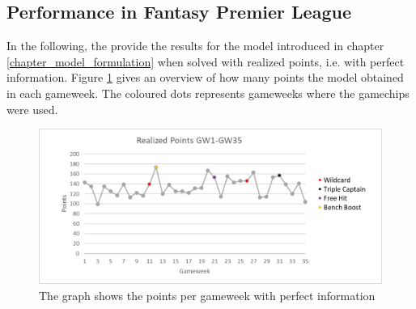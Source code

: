 \subsection{Performance in Fantasy Premier League}
In the following, the provide the results for the model introduced in chapter \ref{chapter_model_formulation} when solved with realized points, i.e. with perfect information. Figure \ref{Figure_Realized_points} gives an overview of how many points the model obtained in each gameweek. The coloured dots represents gameweeks where the gamechips were used. 

\begin{figure}[H]
    \centering
    \includegraphics[scale=0.75]{fig/chapter_7/RealizedPoints_colour.png}
    \caption{The graph shows the points per gameweek with perfect information}
\label{Figure_Realized_points}    
\end{figure}

